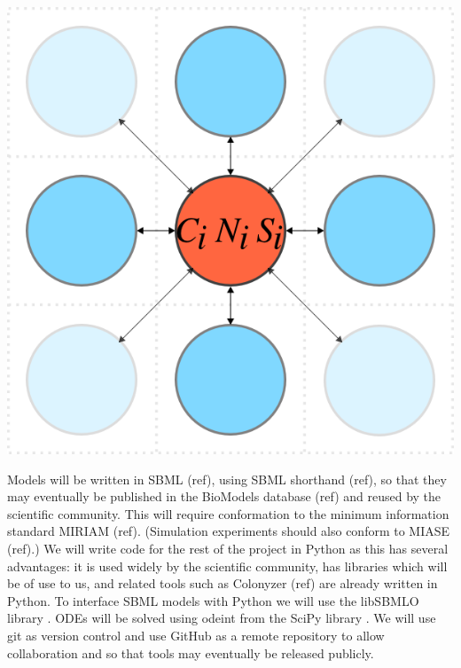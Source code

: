 
\begin{Figure}
  \centering
  \includegraphics[width=\linewidth]{square_array}
  \label{fig:simple_model}
\end{Figure}


Models will be written in SBML (ref), using SBML shorthand (ref), so that they may eventually be published in the BioModels database (ref) and reused by the scientific community. This will require conformation to the minimum information standard MIRIAM (ref). (Simulation experiments should also conform to MIASE (ref).) We will write code for the rest of the project in Python as this has several advantages: it is used widely by the scientific community, has libraries which will be of use to us, and related tools such as Colonyzer (ref) are already written in Python. To interface SBML models with Python we will use the libSBMLO library \citep{Bornstein2008}. ODEs will be solved using odeint from the SciPy library \citep{SciPy}. We will use git as version control and use GitHub as a remote repository to allow collaboration and so that tools may eventually be released publicly.

